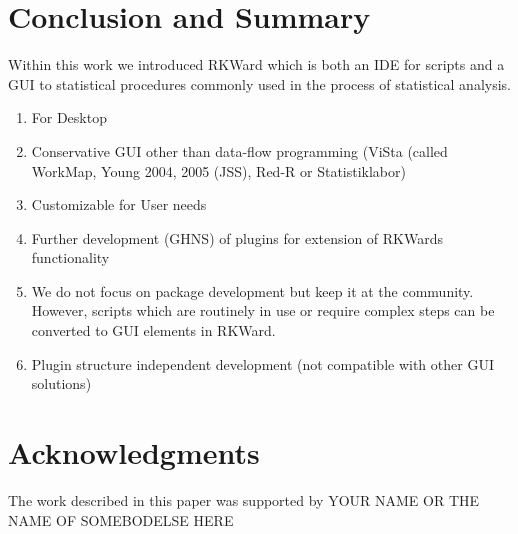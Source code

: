 \section{Conclusion and Summary}
Within this work we introduced RKWard which is both an IDE for
 scripts and a GUI to statistical
procedures commonly used in the process of statistical analysis.

\begin{enumerate}
\item For Desktop
\item Conservative GUI other than data-flow programming (ViSta (called
WorkMap, Young 2004, 2005 (JSS), Red-R or Statistiklabor)
\item Customizable for User needs
\item Further development (GHNS) of plugins for extension of RKWards
functionality
\item We do not focus on  package
development but keep it at the  community.
However, scripts which are routinely in use or require complex steps
can be converted to GUI elements in RKWard.
\item Plugin structure independent development (not compatible with
other  GUI solutions)
\end{enumerate}
\section{Acknowledgments}
The work described in this paper was supported by YOUR NAME OR THE NAME
OF SOMEBODELSE HERE
